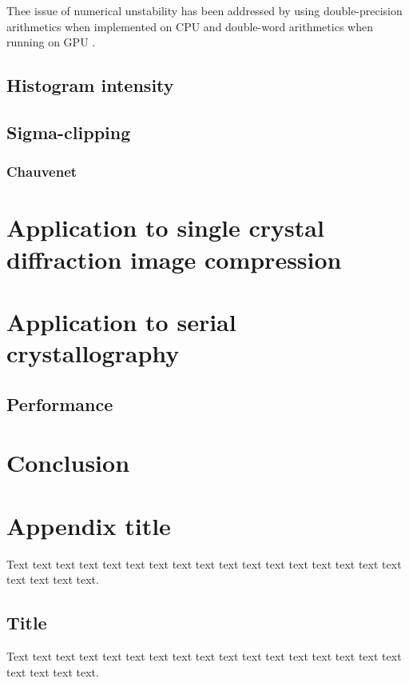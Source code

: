 \documentclass[preprint]{iucr}              %
\begin{document}
Thee issue of numerical unstability has been addressed by using double-precision arithmetics when implemented on CPU and double-word arithmetics when running on GPU \cite{double_word}.
\subsection{Histogram intensity }


\subsection{Sigma-clipping}
\cite{Sivia2006}
\subsubsection{Chauvenet}




\section{Application to single crystal diffraction image compression}

\section{Application to serial crystallography}

\subsection{Performance}
\section{Conclusion}

\appendix
\section{Appendix title}

Text text text text text text text text text text text text text text
text text text text text text text.

\subsection{Title}

Text text text text text text text text text text text text text text
text text text text text text text.
\end{document}
